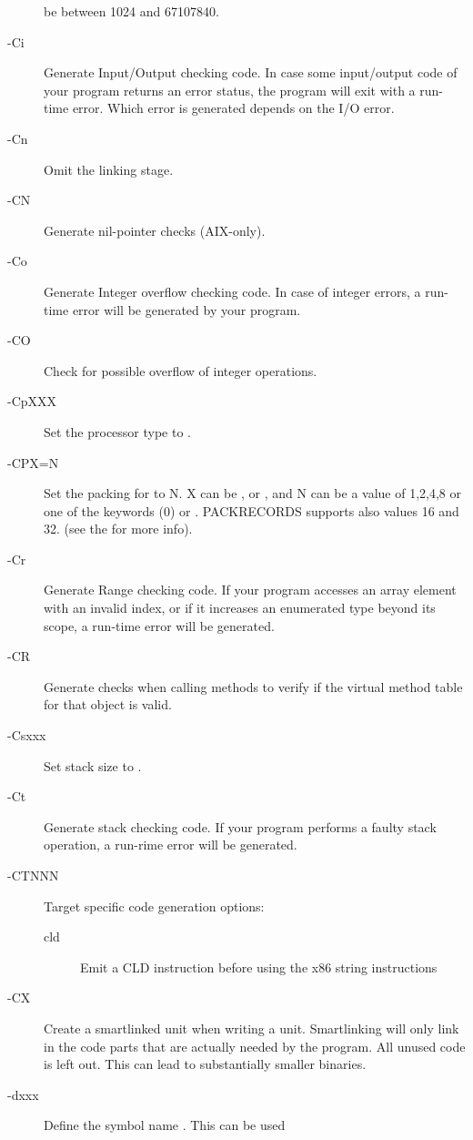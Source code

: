 \begin{description}
be between 1024 and 67107840.
\item [-Ci]  Generate Input/Output checking code. In case some
input/output code of your program returns an error status, the program will
exit with a run-time error. Which error is generated depends on the I/O error.
\item [-Cn]  Omit the linking stage.
\item [-CN]  Generate nil-pointer checks (AIX-only).
\item [-Co]  Generate Integer overflow checking code. In case of
integer errors, a run-time error will be generated by your program.
\item [-CO]  Check for possible overflow of integer operations.
\item [-CpXXX] Set the processor type to .
\item [-CPX=N] Set the packing for  to N. X can be ,
 or , and N can be a value of 1,2,4,8 or one
of the keywords  (0) or . PACKRECORDS supports also
values 16 and 32.  (see the \progref for more info).
\item [-Cr]  Generate Range checking code. If your program
accesses an array element with an invalid index, or if it increases an
enumerated type beyond its scope, a run-time error will be generated.
\item [-CR]  Generate checks when calling methods to verify
if the virtual method table for that object is valid.
\item [-Csxxx]  Set stack size to .
\item [-Ct]  Generate stack checking code. If your program
performs a faulty stack operation, a run-rime error will be generated.
\item [-CTNNN]  Target specific code generation options: 
\begin{description}
\item [cld]Emit a CLD instruction before using the x86 string instructions
\end{description}
\item [-CX]  Create a smartlinked unit when writing a unit.
Smartlinking will only link in the code parts that are actually needed by
the program. All unused code is left out. This can lead to substantially
smaller binaries.
\item [-dxxx]  Define the symbol name . This can be used

\end{description}
